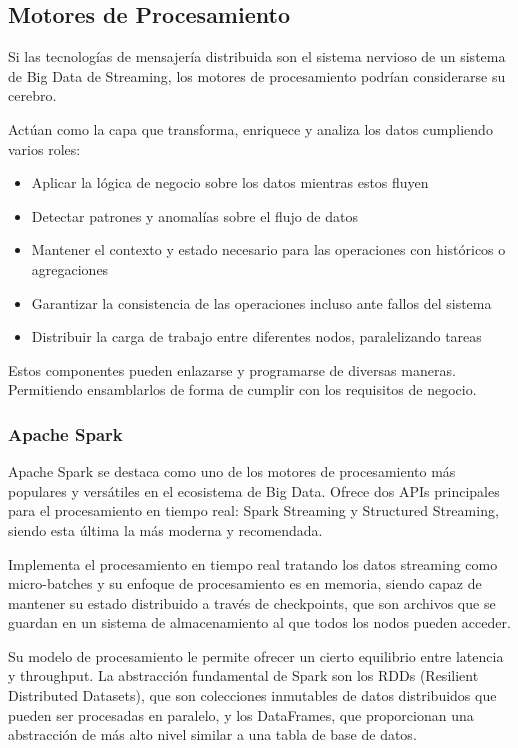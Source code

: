 \subsection{Motores de Procesamiento}

Si las tecnologías de mensajería distribuida son el sistema nervioso de un sistema de Big Data de Streaming, 
los motores de procesamiento podrían considerarse su cerebro.

Actúan como la capa que transforma, enriquece y analiza los datos cumpliendo varios roles:
\begin{itemize}
    \item Aplicar la lógica de negocio sobre los datos mientras estos fluyen
    \item Detectar patrones y anomalías sobre el flujo de datos
    \item Mantener el contexto y estado necesario para las operaciones con históricos o agregaciones
    \item Garantizar la consistencia de las operaciones incluso ante fallos del sistema
    \item Distribuir la carga de trabajo entre diferentes nodos, paralelizando tareas
\end{itemize}

Estos componentes pueden enlazarse y programarse de diversas maneras. Permitiendo ensamblarlos de forma de cumplir 
con los requisitos de negocio.
\newpage
\subsubsection{Apache Spark}

Apache Spark se destaca como uno de los motores de procesamiento más populares y versátiles en el ecosistema de Big Data.
Ofrece dos APIs principales para el procesamiento en tiempo real: Spark Streaming y Structured Streaming,
siendo esta última la más moderna y recomendada. \newline

Implementa el procesamiento en tiempo real tratando los datos streaming
como micro-batches y su enfoque de procesamiento es en memoria, siendo capaz de mantener su estado distribuido a través
de checkpoints, que son archivos que se guardan en un sistema de almacenamiento al que todos los nodos pueden acceder.\newline

Su modelo de procesamiento le permite ofrecer un cierto equilibrio entre latencia y throughput. La abstracción fundamental
de Spark son los RDDs (Resilient Distributed Datasets), que son colecciones inmutables de datos distribuidos que pueden
ser procesadas en paralelo, y los DataFrames, que proporcionan una abstracción de más alto nivel similar a una tabla de
base de datos.\newline

